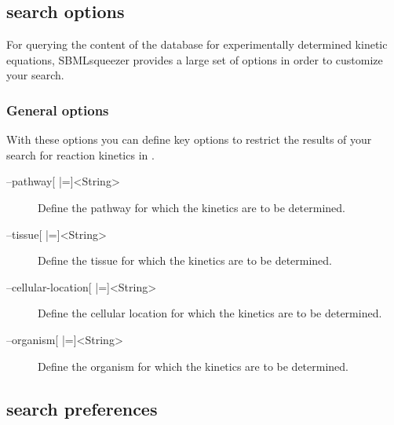 \subsection{\SABIO search options}
\label{sec:SABIO_search_options}

For querying the content of the \SABIO database for experimentally determined
kinetic equations, SBMLsqueezer provides a large set of options in order to
customize your search.

\subsubsection{General options}

With these options you can define key options to restrict the results of
your search for reaction kinetics in \SABIO.
\begin{description}
\item[--pathway{[} |={]}<String>]
  Define the pathway for which the kinetics are to be determined.

\item[--tissue{[} |={]}<String>]
  Define the tissue for which the kinetics are to be determined.

\item[--cellular-location{[} |={]}<String>]
  Define the cellular location for which the kinetics are to be
  determined.

\item[--organism{[} |={]}<String>]
  Define the organism for which the kinetics are to be determined.
\end{description}

\subsection{\SABIO search preferences}
\label{sec:SABIO_search_preferences}

